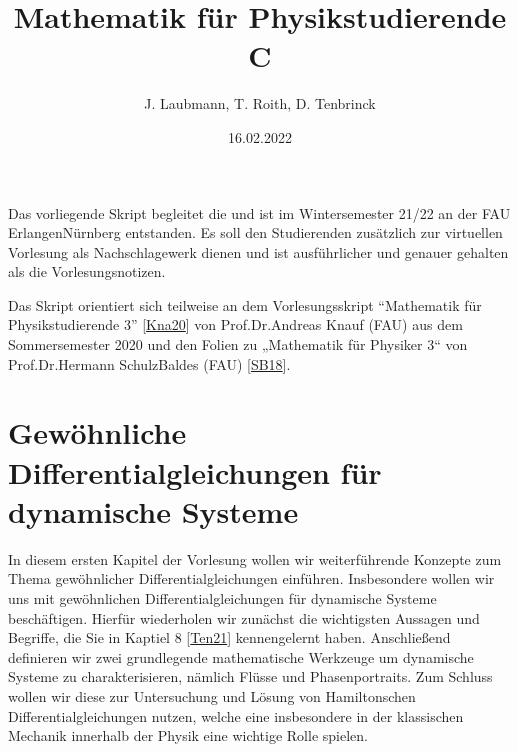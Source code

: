 \documentclass[letterpaper,10pt,german]{jupyterBook}
\title{Mathematik für Physikstudierende C}
\date{16.02.2022}
\author{J.\@{} Laubmann, T.\@{} Roith, D.\@{} Tenbrinck}
\begin{document}
\pagestyle{empty}
\sphinxmaketitle
\pagestyle{plain}
\sphinxtableofcontents
\pagestyle{normal}
\label{\detokenize{intro::doc}}

\begin{sphinxVerbatimOutput}

\noindent{}
\end{sphinxVerbatimOutput}

\sphinxAtStartPar
Das vorliegende Skript begleitet die  und ist im Wintersemester 21/22 an der FAU Erlangen\sphinxhyphen{}Nürnberg entstanden. Es soll den Studierenden zusätzlich zur virtuellen Vorlesung als Nachschlagewerk dienen und ist ausführlicher und genauer gehalten als die Vorlesungsnotizen.

\begin{DUlineblock}{0em}
\item[] 
\end{DUlineblock}

\sphinxAtStartPar
Das Skript orientiert sich teilweise an dem Vorlesungsskript “Mathematik für Physikstudierende 3” {[}\hyperlink{cite.references:id9}{Kna20}{]} von Prof.Dr.Andreas Knauf (FAU) aus dem Sommersemester 2020 und den Folien zu „Mathematik für Physiker 3“ von Prof.Dr.Hermann Schulz\sphinxhyphen{}Baldes (FAU) {[}\hyperlink{cite.references:id12}{SB18}{]}.


\chapter{Gewöhnliche Differentialgleichungen für dynamische Systeme}
\label{\detokenize{ode/ode:gewohnliche-differentialgleichungen-fur-dynamische-systeme}}\label{\detokenize{ode/ode::doc}}
\sphinxAtStartPar
In diesem ersten Kapitel der Vorlesung wollen wir weiterführende Konzepte zum Thema gewöhnlicher Differentialgleichungen einführen.
Insbesondere wollen wir uns mit gewöhnlichen Differentialgleichungen für dynamische Systeme beschäftigen.
Hierfür wiederholen wir zunächst die wichtigsten Aussagen und Begriffe, die Sie in Kaptiel 8 {[}\hyperlink{cite.references:id15}{Ten21}{]} kennengelernt haben.
Anschließend definieren wir zwei grundlegende mathematische Werkzeuge um dynamische Systeme zu charakterisieren, nämlich Flüsse und Phasenportraits.
Zum Schluss wollen wir diese zur Untersuchung und Lösung von Hamiltonschen Differentialgleichungen nutzen, welche eine insbesondere in der klassischen Mechanik innerhalb der Physik eine wichtige Rolle spielen.
\end{document}

